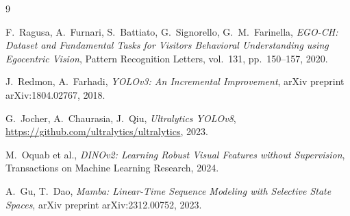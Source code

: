 \documentclass[a4paper,12pt]{report}
\begin{document}
\begin{thebibliography}{9}

F.~Ragusa, A.~Furnari, S.~Battiato, G.~Signorello, G.~M.~Farinella,
\textit{EGO-CH: Dataset and Fundamental Tasks for Visitors Behavioral Understanding using Egocentric Vision},
Pattern Recognition Letters, vol.~131, pp.~150--157, 2020.

J.~Redmon, A.~Farhadi,
\textit{YOLOv3: An Incremental Improvement},
arXiv preprint arXiv:1804.02767, 2018.

G.~Jocher, A.~Chaurasia, J.~Qiu,
\textit{Ultralytics YOLOv8},
\url{https://github.com/ultralytics/ultralytics}, 2023.

M.~Oquab et al.,
\textit{DINOv2: Learning Robust Visual Features without Supervision},
Transactions on Machine Learning Research, 2024.

A.~Gu, T.~Dao,
\textit{Mamba: Linear-Time Sequence Modeling with Selective State Spaces},
arXiv preprint arXiv:2312.00752, 2023.

\end{thebibliography}
\end{document}
